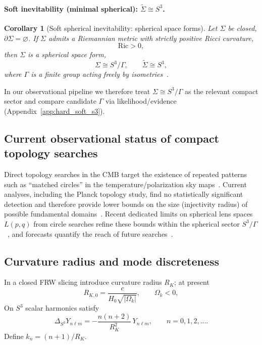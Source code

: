 \documentclass[
  reprint,
  amsmath,amssymb,
  aps,
  prd,
  superscriptaddress,
  nofootinbib,
  longbibliography
]{revtex4-2}
\newcommand{\Sthree}{S^{3}}
\newcommand{\Sig}{\Sigma}
\newtheorem{corollary}{Corollary}
\theoremstyle{definition}
\theoremstyle{remark}
\begin{document}
\paragraph{Soft inevitability (minimal spherical): $\widetilde{\Sig}\cong \Sthree$.}
\begin{corollary}[Soft spherical inevitability: spherical space forms]
\label{cor:soft_s3_main}
Let $\Sig$ be closed, $\partial\Sig=\varnothing$. If $\Sig$ admits a Riemannian metric with strictly positive
Ricci curvature,
\begin{equation}
\mathrm{Ric}>0,
\end{equation}
then $\Sig$ is a spherical space form,
\begin{equation}
\Sig\cong \Sthree/\Gamma,\qquad \widetilde{\Sig}\cong \Sthree,
\end{equation}
where $\Gamma$ is a finite group acting freely by isometries~\cite{Hamilton1982PositiveRicci,Scott3Manifolds,WolfConstantCurvature}.
\end{corollary}
In our observational pipeline we therefore treat $\Sig\cong \Sthree/\Gamma$ as the relevant compact sector and compare
candidate $\Gamma$ via likelihood/evidence (Appendix~\ref{app:hard_soft_s3}).

\subsection{Current observational status of compact topology searches}
\label{sec:topology_status}
Direct topology searches in the CMB target the existence of repeated patterns such as ``matched circles''
in the temperature/polarization sky maps~\cite{CornishSpergelStarkman1998}. Current analyses, including the
Planck topology study, find no statistically significant detection and therefore provide lower bounds on
the size (injectivity radius) of possible fundamental domains~\cite{Planck2015Topology}. Recent dedicated
limits on spherical lens spaces $L(p,q)$ from circle searches refine these bounds within the spherical sector
$\Sthree/\Gamma$~\cite{Saha2024LensSpaces}, and forecasts quantify the reach of future searches~\cite{FutureTopologySearches}.

\subsection{Curvature radius and mode discreteness}
In a closed FRW slicing introduce curvature radius $R_K$; at present
\begin{equation}
R_{K,0}=\frac{c}{H_0\sqrt{|\Omega_k|}},\qquad \Omega_k<0,
\label{eq:RK0_Omegak}
\end{equation}
On $\Sthree$ scalar harmonics satisfy
\begin{equation}
\Delta_{\Sthree}Y_{n\ell m}=-\frac{n(n+2)}{R_K^2}\,Y_{n\ell m},
\qquad n=0,1,2,\dots.
\label{eq:S3_scalar_eigs}
\end{equation}
Define $k_n=(n+1)/R_K$.
\end{document}

